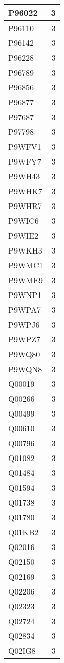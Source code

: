 \documentclass[
]{book}
\theoremstyle{definition}
\theoremstyle{definition}
\theoremstyle{definition}
\theoremstyle{definition}
\theoremstyle{remark}
\begin{document}
\begin{table}
\begin{tabular}{l|r}
\hline
P96022 & 3\\
\hline
P96110 & 3\\
\hline
P96142 & 3\\
\hline
P96228 & 3\\
\hline
P96789 & 3\\
\hline
P96856 & 3\\
\hline
P96877 & 3\\
\hline
P97687 & 3\\
\hline
P97798 & 3\\
\hline
P9WFV1 & 3\\
\hline
P9WFY7 & 3\\
\hline
P9WH43 & 3\\
\hline
P9WHK7 & 3\\
\hline
P9WHR7 & 3\\
\hline
P9WIC6 & 3\\
\hline
P9WIE2 & 3\\
\hline
P9WKH3 & 3\\
\hline
P9WMC1 & 3\\
\hline
P9WME9 & 3\\
\hline
P9WNP1 & 3\\
\hline
P9WPA7 & 3\\
\hline
P9WPJ6 & 3\\
\hline
P9WPZ7 & 3\\
\hline
P9WQ80 & 3\\
\hline
P9WQN8 & 3\\
\hline
Q00019 & 3\\
\hline
Q00266 & 3\\
\hline
Q00499 & 3\\
\hline
Q00610 & 3\\
\hline
Q00796 & 3\\
\hline
Q01082 & 3\\
\hline
Q01484 & 3\\
\hline
Q01594 & 3\\
\hline
Q01738 & 3\\
\hline
Q01780 & 3\\
\hline
Q01KB2 & 3\\
\hline
Q02016 & 3\\
\hline
Q02150 & 3\\
\hline
Q02169 & 3\\
\hline
Q02206 & 3\\
\hline
Q02323 & 3\\
\hline
Q02724 & 3\\
\hline
Q02834 & 3\\
\hline
Q02IG8 & 3\\

\end{tabular}
\end{table}
\end{document}
